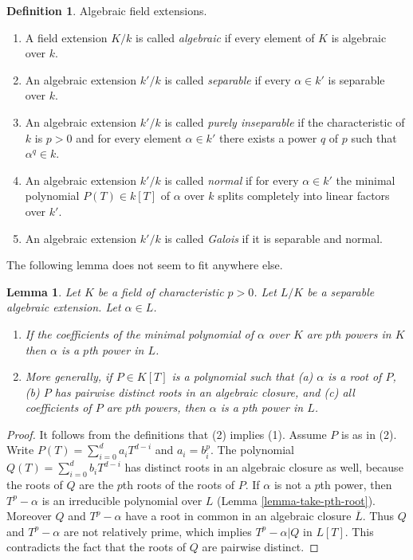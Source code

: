\documentclass{stacks-project}
\theoremstyle{plain}
\newtheorem{lemma}[subsection]{Lemma}
\theoremstyle{definition}
\newtheorem{definition}[subsection]{Definition}
\theoremstyle{remark}
\numberwithin{equation}{subsection}
\begin{document}
\begin{definition}
\label{definition-separable-algebraic}
Algebraic field extensions.
\begin{enumerate}
\item A field extension $K/k$ is called {\it algebraic}
if every element of $K$ is algebraic over $k$.
\item An algebraic extension $k'/k$ is called {\it separable}
if every $\alpha \in k'$ is separable over $k$.
\item An algebraic
extension $k'/k$ is called {\it purely inseparable} if
the characteristic of $k$ is $p > 0$ and for every element
$\alpha \in k'$ there exists a power $q$ of $p$ such that
$\alpha^q \in k$.
\item An algebraic extension $k'/k$ is called {\it normal}
if for every $\alpha \in k'$ the minimal polynomial $P(T) \in k[T]$
of $\alpha$ over $k$ splits completely into linear factors over $k'$.
\item An algebraic extension $k'/k$ is called {\it Galois}
if it is separable and normal.
\end{enumerate}
\end{definition}

\noindent
The following lemma does not seem to fit anywhere else.

\begin{lemma}
\label{lemma-pth-root}
Let $K$ be a field of characteristic $p > 0$. Let $L/K$ be a separable
algebraic extension. Let $\alpha \in L$.
\begin{enumerate}
\item If the coefficients of the minimal polynomial of $\alpha$
over $K$ are $p$th powers in $K$ then $\alpha$ is a $p$th
power in $L$.
\item More generally, if $P \in K[T]$ is a polynomial such that (a) $\alpha$
is a root of $P$, (b) $P$ has pairwise distinct roots in an algebraic closure,
and (c) all coefficients of $P$ are $p$th powers, then $\alpha$ is a
$p$th power in $L$.
\end{enumerate}
\end{lemma}

\begin{proof}
It follows from the definitions that (2) implies (1). Assume $P$ is as in (2).
Write $P(T) = \sum\nolimits_{i = 0}^d a_i T^{d - i}$ and $a_i = b_i^p$.
The polynomial $Q(T) = \sum\nolimits_{i = 0}^d b_i T^{d - i}$ has distinct
roots in an algebraic closure as well, because the roots of $Q$
are the $p$th roots of the roots of $P$. If $\alpha$ is not a $p$th power,
then $T^p - \alpha$ is an irreducible polynomial over $L$
(Lemma \ref{lemma-take-pth-root}).
Moreover $Q$ and $T^p - \alpha$ have a root in common in
an algebraic closure $\overline{L}$.
Thus $Q$ and $T^p - \alpha$ are not relatively prime, which
implies $T^p - \alpha | Q$ in $L[T]$. This contradicts the fact that
the roots of $Q$ are pairwise distinct.
\end{proof}
















\end{document}
